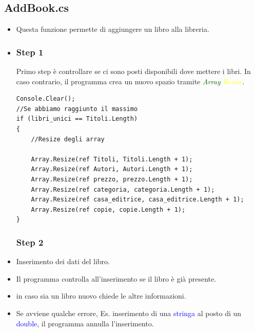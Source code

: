 \documentclass[a4paper,12pt]{article}
\begin{document}
\newpage

\subsection{AddBook.cs}
\begin{itemize}
    \item Questa funzione permette di aggiungere un libro alla libreria.
    \item 
    \subsubsection{Step 1}
        Primo step è controllare se ci sono posti disponibili dove mettere i libri.
        In caso contrario, il programma crea un nuovo spazio tramite \textcolor{darkgreen}{\textit{Array}}\textcolor{yellow}{\textit{.Resize}}.

\begin{lstlisting}[caption=Controllo spazio disponibile]
Console.Clear();
//Se abbiamo raggiunto il massimo
if (libri_unici == Titoli.Length)
{
    //Resize degli array
                    
    Array.Resize(ref Titoli, Titoli.Length + 1);
    Array.Resize(ref Autori, Autori.Length + 1);
    Array.Resize(ref prezzo, prezzo.Length + 1);
    Array.Resize(ref categoria, categoria.Length + 1);
    Array.Resize(ref casa_editrice, casa_editrice.Length + 1);
    Array.Resize(ref copie, copie.Length + 1);                 
}
\end{lstlisting}

    \newpage

    \subsubsection{Step 2}
    
    \item Inserimento dei dati del libro.
    \item Il programma controlla all'inserimento se il libro è già presente.
    \item in caso sia un libro nuovo chiede le altre informazioni.
    \item Se avviene qualche errore, Es. inserimento di una \textcolor{blue}{stringa} al posto di un \textcolor{blue}{double}, il programma annulla l'inserimento.
        
    
\end{itemize}
\end{document}
